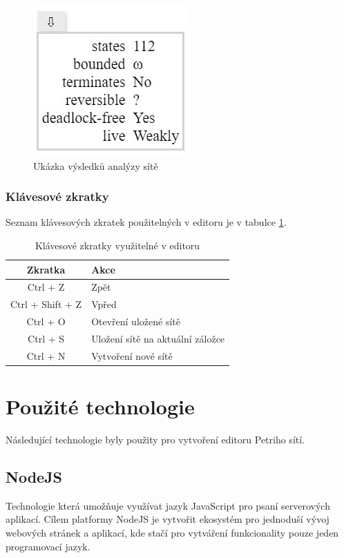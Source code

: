 \documentclass[
  biblatex,
  glossaries,
]{kidiplom}
\begin{document}
\clearpage

\begin{figure}[h]
  \centering
  \includegraphics{analysis}
  \caption{Ukázka výsledků analýzy sítě}\label{analýza obrázek}
\end{figure}

\subsubsection{Klávesové zkratky}\label{zkratky}

Seznam klávesových zkratek použitelných v editoru je v tabulce \ref{tabulka zkratky}.
\begin{table}[h!]
  \centering
  \begin{tabular}{| c | l |}
    \hline
    Zkratka & Akce \\
    \hline
    Ctrl + Z      & Zpět \\
    Ctrl + Shift + Z & Vpřed \\
    Ctrl + O & Otevření uložené sítě \\
    Ctrl + S & Uložení sítě na aktuální záložce\\
    Ctrl + N & Vytvoření nové sítě \\
    \hline
  \end{tabular}
  \caption{Klávesové zkratky využitelné v editoru}\label{tabulka zkratky}
\end{table}




\section{Použité technologie}

Následující technologie byly použity pro vytvoření editoru Petriho sítí.


\subsection{NodeJS}
Technologie která umožňuje využívat jazyk JavaScript pro psaní 
serverových aplikací. Cílem platformy NodeJS je vytvořit
ekosystém pro jednoduší vývoj webových stránek a aplikací, 
kde stačí pro vytváření funkcionality pouze jeden programovací jazyk.
\end{document}
